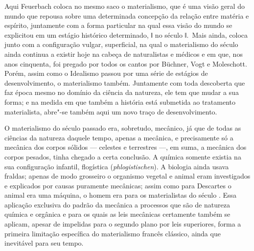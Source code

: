 Aqui
Feuerbach coloca
no mesmo saco o materialismo, que é uma visão geral do mundo que repousa
sobre uma determinada concepção da relação entre matéria e espírito,
juntamente com a forma particular na qual essa visão do mundo se
explicitou em um estágio histórico determinado, ǁ no século  ǁ.\est\
Mais ainda, coloca junto com a configuração vulgar, superficial, na qual
o materialismo do século \versal{XVIII} ainda continua a existir hoje na cabeça
de naturalistas e médicos e em que, nos anos cinquenta, foi pregado por
todos os cantos
por Büchner, Vogt e Moleschott. Porém,
assim como o Idealismo passou por uma série de estágios de
desenvolvimento, o materialismo também. Juntamente com toda descoberta
que faz época mesmo no domínio da ciência da natureza, ele tem que mudar
a sua forma; e na medida em que também a história está submetida ao
tratamento materialista, abre"-se também aqui um novo traço de
desenvolvimento.

O materialismo do século passado era, sobretudo, mecânico, já que de
todas as ciências da natureza daquele tempo, apenas a mecânica, e
precisamente só a mecânica dos corpos sólidos --- celestes e terrestres ---,
em suma, a mecânica dos corpos pesados, tinha chegado a certa conclusão.
A química somente existia na sua configuração infantil, flogística
(\emph{phlogistischen}). A biologia ainda
usava fraldas; apenas de modo grosseiro o organismo vegetal e animal
eram investigados e explicados por causas puramente mecânicas; assim
como
para Descartes o
animal era uma máquina, o homem era para os materialistas do século
\versal{XVIII}. Essa aplicação exclusiva do padrão da mecânica a processos que
são de natureza química e orgânica e para os quais as leis mecânicas
certamente também se aplicam, apesar de impelidas para o segundo plano
por leis superiores, forma a primeira limitação específica do
materialismo francês clássico, ainda que inevitável para seu tempo.

